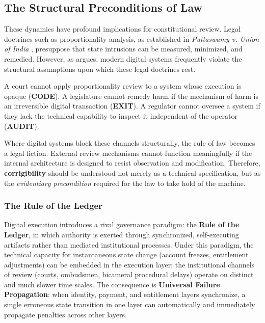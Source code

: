\documentclass{article}
\begin{document}
\subsection{The Structural Preconditions of Law}
\label{subsec:rule-of-ledger}

These dynamics have profound implications for constitutional review. Legal doctrines such as proportionality analysis, as established in \textit{Puttaswamy v. Union of India} \citep{puttaswamy2017}, presuppose that state intrusions can be measured, minimized, and remedied. However, as \citet{bhatia2019} argues, modern digital systems frequently violate the structural assumptions upon which these legal doctrines rest.

A court cannot apply proportionality review to a system whose execution is opaque (\textbf{CODE}). A legislature cannot remedy harm if the mechanism of harm is an irreversible digital transaction (\textbf{EXIT}). A regulator cannot oversee a system if they lack the technical capability to inspect it independent of the operator (\textbf{AUDIT}).

Where digital systems block these channels structurally, the rule of law becomes a legal fiction. External review mechanisms cannot function meaningfully if the internal architecture is designed to resist observation and modification. Therefore, \textbf{corrigibility} should be understood not merely as a technical specification, but as the \textit{evidentiary precondition} required for the law to take hold of the machine.

\subsubsection{The Rule of the Ledger}

Digital execution introduces a rival governance paradigm: the \textbf{Rule of the Ledger}, in which authority is exerted through synchronized, self-executing artifacts rather than mediated institutional processes. Under this paradigm, the technical capacity for instantaneous state change (account freezes, entitlement adjustments) can be embedded in the execution layer; the institutional channels of review (courts, ombudsmen, bicameral procedural delays) operate on distinct and much slower time scales. The consequence is \textbf{Universal Failure Propagation}: when identity, payment, and entitlement layers synchronize, a single erroneous state transition in one layer can automatically and immediately propagate penalties across other layers.
\end{document}
